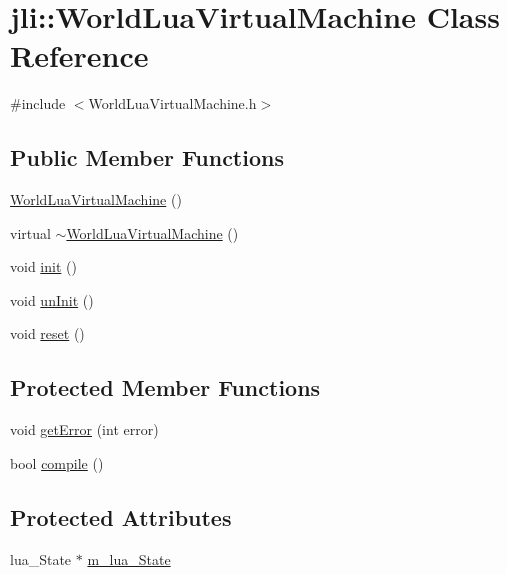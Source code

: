 \hypertarget{classjli_1_1_world_lua_virtual_machine}{\section{jli\+:\+:World\+Lua\+Virtual\+Machine Class Reference}
\label{classjli_1_1_world_lua_virtual_machine}
}


{\ttfamily \#include $<$World\+Lua\+Virtual\+Machine.\+h$>$}

\subsection*{Public Member Functions}
\begin{DoxyCompactItemize}
\item 
\hyperlink{classjli_1_1_world_lua_virtual_machine_a6c198a8d45744d6297875cec1ac31b5f}{World\+Lua\+Virtual\+Machine} ()
\item 
virtual \hyperlink{classjli_1_1_world_lua_virtual_machine_a522619d2dc14b8828e9b91d76b1fa572}{$\sim$\+World\+Lua\+Virtual\+Machine} ()
\item 
void \hyperlink{classjli_1_1_world_lua_virtual_machine_a149a5954ec33c12d4a3a5e66e418efb2}{init} ()
\item 
void \hyperlink{classjli_1_1_world_lua_virtual_machine_aa10f035d6f133f0cb05e9f769992ed00}{un\+Init} ()
\item 
void \hyperlink{classjli_1_1_world_lua_virtual_machine_aec6b7830afcb04e7cb612742d23e5870}{reset} ()
\end{DoxyCompactItemize}
\subsection*{Protected Member Functions}
\begin{DoxyCompactItemize}
\item 
void \hyperlink{classjli_1_1_world_lua_virtual_machine_a7aac18365ee2fa9efb7c28a5b5637edb}{get\+Error} (int error)
\item 
bool \hyperlink{classjli_1_1_world_lua_virtual_machine_a6e55818ab8b7d3e13207d9db8f577c64}{compile} ()
\end{DoxyCompactItemize}
\subsection*{Protected Attributes}
\begin{DoxyCompactItemize}
\item 
lua\+\_\+\+State $\ast$ \hyperlink{classjli_1_1_world_lua_virtual_machine_aad7e6df2c4aef4106c9d9e81ad4ac3db}{m\+\_\+lua\+\_\+\+State}
\end{DoxyCompactItemize}


